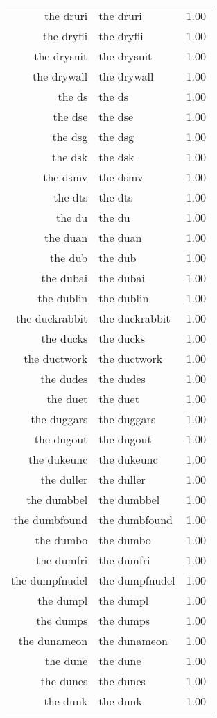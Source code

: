 \begin{table}[ht]
\begin{tabular}{rlr}
  the druri & the druri & 1.00 \\ 
  the dryfli & the dryfli & 1.00 \\ 
  the drysuit & the drysuit & 1.00 \\ 
  the drywall & the drywall & 1.00 \\ 
  the ds & the ds & 1.00 \\ 
  the dse & the dse & 1.00 \\ 
  the dsg & the dsg & 1.00 \\ 
  the dsk & the dsk & 1.00 \\ 
  the dsmv & the dsmv & 1.00 \\ 
  the dts & the dts & 1.00 \\ 
  the du & the du & 1.00 \\ 
  the duan & the duan & 1.00 \\ 
  the dub & the dub & 1.00 \\ 
  the dubai & the dubai & 1.00 \\ 
  the dublin & the dublin & 1.00 \\ 
  the duckrabbit & the duckrabbit & 1.00 \\ 
  the ducks & the ducks & 1.00 \\ 
  the ductwork & the ductwork & 1.00 \\ 
  the dudes & the dudes & 1.00 \\ 
  the duet & the duet & 1.00 \\ 
  the duggars & the duggars & 1.00 \\ 
  the dugout & the dugout & 1.00 \\ 
  the dukeunc & the dukeunc & 1.00 \\ 
  the duller & the duller & 1.00 \\ 
  the dumbbel & the dumbbel & 1.00 \\ 
  the dumbfound & the dumbfound & 1.00 \\ 
  the dumbo & the dumbo & 1.00 \\ 
  the dumfri & the dumfri & 1.00 \\ 
  the dumpfnudel & the dumpfnudel & 1.00 \\ 
  the dumpl & the dumpl & 1.00 \\ 
  the dumps & the dumps & 1.00 \\ 
  the dunameon & the dunameon & 1.00 \\ 
  the dune & the dune & 1.00 \\ 
  the dunes & the dunes & 1.00 \\ 
  the dunk & the dunk & 1.00 \\ 

\end{tabular}
\end{table}
